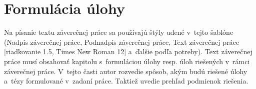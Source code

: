 \section{Formul\'acia \'ulohy}
Na písanie textu záverečnej práce sa používajú štýly udené v~tejto
šablóne (Nadpis záverečnej práce, Podnadpis záverečnej práce, Text
záverečnej práce [riadkovanie 1.5, Times New Roman 12] a~ďalšie podľa
potreby). Text záverečnej práce musí obsahovať\/ kapitolu s~formuláciou
úlohy resp. úloh riešených v~rámci záverečnej práce. V~tejto časti
autor rozvedie spôsob, akým budú riešené úlohy a~tézy formulované
v~zadaní práce. Taktiež uvedie prehľad podmienok riešenia.